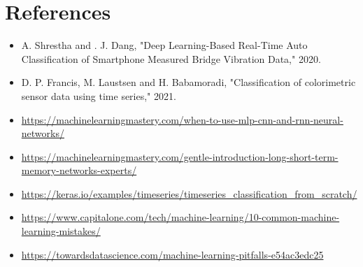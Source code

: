 \documentclass[10pt,letterpaper]{article}
\begin{document}
\section*{References}
\begin{itemize}
\item A. Shrestha and . J. Dang, "Deep Learning-Based Real-Time Auto Classification of Smartphone Measured Bridge Vibration Data," 2020. 
\item D. P. Francis, M. Laustsen and H. Babamoradi, "Classification of colorimetric sensor data using time series," 2021. 
\item \url{https://machinelearningmastery.com/when-to-use-mlp-cnn-and-rnn-neural-networks/}
\item \url{https://machinelearningmastery.com/gentle-introduction-long-short-term-memory-networks-experts/}
\item \url{https://keras.io/examples/timeseries/timeseries_classification_from_scratch/}
\item \url{https://www.capitalone.com/tech/machine-learning/10-common-machine-learning-mistakes/}
\item \url{https://towardsdatascience.com/machine-learning-pitfalls-e54ac3edc25}
\end{itemize}

\paragraph{}
\end{document}
